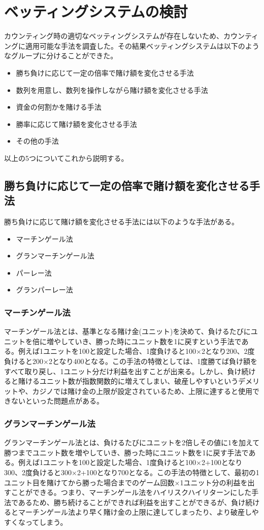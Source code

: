 \section{ベッティングシステムの検討}
カウンティング時の適切なベッティングシステムが存在しないため、カウンティングに適用可能な手法を調査した。その結果ベッティングシステムは以下のようなグループに分けることができた。
\begin{itemize}
\item 勝ち負けに応じて一定の倍率で賭け額を変化させる手法
\item 数列を用意し、数列を操作しながら賭け額を変化させる手法
\item 資金の何割かを賭ける手法
\item 勝率に応じて賭け額を変化させる手法
\item その他の手法
\end{itemize}
以上の5つについてこれから説明する。

\subsection{勝ち負けに応じて一定の倍率で賭け額を変化させる手法}
勝ち負けに応じて賭け額を変化させる手法には以下のような手法がある。
\begin{itemize}
\item マーチンゲール法
\item グランマーチンゲール法
\item パーレー法
\item グランパーレー法
\end{itemize}
\subsubsection{マーチンゲール法}
マーチンゲール法とは、基準となる賭け金(ユニット)を決めて、負けるたびにユニットを倍に増やしていき、勝った時にユニット数を1に戻すという手法である。例えば1ユニットを100と設定した場合、1度負けると100×2となり200、2度負けると200×2となり400となる。この手法の特徴としては、1度勝てば負け額をすべて取り戻し、1ユニット分だけ利益を出すことが出来る。しかし、負け続けると賭けるユニット数が指数関数的に増えてしまい、破産しやすいというデメリットや、カジノでは賭け金の上限が設定されているため、上限に達すると使用できないといった問題点がある。
\subsubsection{グランマーチンゲール法}
グランマーチンゲール法とは、負けるたびにユニットを2倍しその値に1を加えて勝つまでユニット数を増やしていき、勝った時にユニット数を1に戻す手法である。例えば1ユニットを100と設定した場合、1度負けると100×2+100となり300、2度負けると300×2+100となり700となる。この手法の特徴として、最初の1ユニット目を賭けてから勝った場合までのゲーム回数×1ユニット分の利益を出すことができる。つまり、マーチンゲール法をハイリスクハイリターンにした手法であるため、勝ち続けることができれば利益を出すことができるが、負け続けるとマーチンゲール法より早く賭け金の上限に達してしまったり、より破産しやすくなってしまう。
